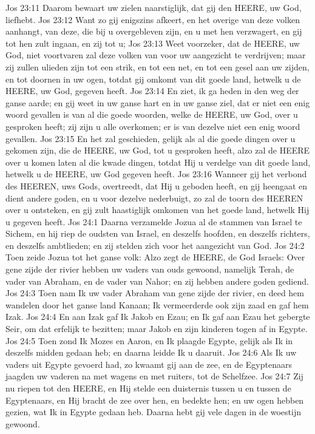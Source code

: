 Jos 23:11  Daarom bewaart uw zielen naarstiglijk, dat gij den HEERE, uw God, liefhebt.
Jos 23:12  Want zo gij enigszins afkeert, en het overige van deze volken aanhangt, van deze, die bij u overgebleven zijn, en u met hen verzwagert, en gij tot hen zult ingaan, en zij tot u;
Jos 23:13  Weet voorzeker, dat de HEERE, uw God, niet voortvaren zal deze volken van voor uw aangezicht te verdrijven; maar zij zullen ulieden zijn tot een strik, en tot een net, en tot een gesel aan uw zijden, en tot doornen in uw ogen, totdat gij omkomt van dit goede land, hetwelk u de HEERE, uw God, gegeven heeft.
Jos 23:14  En ziet, ik ga heden in den weg der ganse aarde; en gij weet in uw ganse hart en in uw ganse ziel, dat er niet een enig woord gevallen is van al die goede woorden, welke de HEERE, uw God, over u gesproken heeft; zij zijn u alle overkomen; er is van dezelve niet een enig woord gevallen.
Jos 23:15  En het zal geschieden, gelijk als al die goede dingen over u gekomen zijn, die de HEERE, uw God, tot u gesproken heeft, alzo zal de HEERE over u komen laten al die kwade dingen, totdat Hij u verdelge van dit goede land, hetwelk u de HEERE, uw God gegeven heeft.
Jos 23:16  Wanneer gij het verbond des HEEREN, uws Gods, overtreedt, dat Hij u geboden heeft, en gij heengaat en dient andere goden, en u voor dezelve nederbuigt, zo zal de toorn des HEEREN over u ontsteken, en gij zult haastiglijk omkomen van het goede land, hetwelk Hij u gegeven heeft.
Jos 24:1  Daarna verzamelde Jozua al de stammen van Israel te Sichem, en hij riep de oudsten van Israel, en deszelfs hoofden, en deszelfs richters, en deszelfs ambtlieden; en zij stelden zich voor het aangezicht van God.
Jos 24:2  Toen zeide Jozua tot het ganse volk: Alzo zegt de HEERE, de God Israels: Over gene zijde der rivier hebben uw vaders van ouds gewoond, namelijk Terah, de vader van Abraham, en de vader van Nahor; en zij hebben andere goden gediend.
Jos 24:3  Toen nam Ik uw vader Abraham van gene zijde der rivier, en deed hem wandelen door het ganse land Kanaan; Ik vermeerderde ook zijn zaad en gaf hem Izak.
Jos 24:4  En aan Izak gaf Ik Jakob en Ezau; en Ik gaf aan Ezau het gebergte Seir, om dat erfelijk te bezitten; maar Jakob en zijn kinderen togen af in Egypte.
Jos 24:5  Toen zond Ik Mozes en Aaron, en Ik plaagde Egypte, gelijk als Ik in deszelfs midden gedaan heb; en daarna leidde Ik u daaruit.
Jos 24:6  Als Ik uw vaders uit Egypte gevoerd had, zo kwaamt gij aan de zee, en de Egyptenaars jaagden uw vaderen na met wagens en met ruiters, tot de Schelfzee.
Jos 24:7  Zij nu riepen tot den HEERE, en Hij stelde een duisternis tussen u en tussen de Egyptenaars, en Hij bracht de zee over hen, en bedekte hen; en uw ogen hebben gezien, wat Ik in Egypte gedaan heb. Daarna hebt gij vele dagen in de woestijn gewoond.
